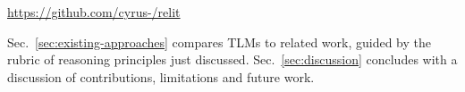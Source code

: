 \documentclass[acmsmall]{acmart}
\begin{document}
\begin{center}
\url{https://github.com/cyrus-/relit}
\end{center}

\noindent
Sec.~\ref{sec:existing-approaches} compares TLMs to related work, guided by the rubric of reasoning principles just discussed. 
Sec.~\ref{sec:discussion} concludes with a discussion of contributions, limitations and future work.

\end{document}
